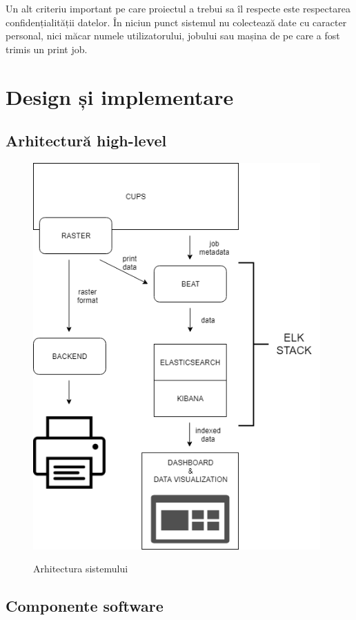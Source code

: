 \documentclass[12pt]{report}
\begin{document}
Un alt criteriu important pe care proiectul a trebui sa îl respecte este respectarea confidențialității datelor. În niciun punct sistemul nu colectează date cu caracter personal, nici măcar numele utilizatorului, jobului sau mașina de pe care a fost trimis un print job. 


\chapter{Design și implementare}

	\section{Arhitectură high-level}

		\begin{figure}[h]
			\centering
				{\includegraphics[width=110mm]{cups.png}}
			\caption{Arhitectura sistemului}
		\end{figure}

	\section{Componente software}
\end{document}
